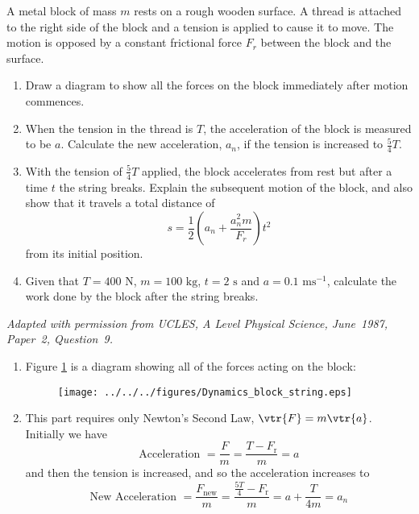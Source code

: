 
\begin{problem}[A1987PSIIQ9a] %
{A metal block of mass $m$ rests on a rough wooden surface. A thread is attached to the right side of the block and a tension is applied to cause it to move. The motion is opposed by a constant frictional force $F_{r}$ between the block and the surface.
\begin{enumerate}
	\item Draw a diagram to show all the forces on the block immediately after motion commences.
	\item When the tension in the thread is $T$, the acceleration of the block is measured to be $a$. Calculate the new acceleration, $a_{n}$, if the tension is increased to $\frac{5}{4}T$.
	\item With the tension of $\frac{5}{4}T$ applied, the block accelerates from rest but after a time $t$ the string breaks. Explain the subsequent motion of the block, and also show that it travels a total distance of 
	\begin{equation*} 
	s = \frac{1}{2} \left(a_{n} + \frac{a_{n}^{2}m}{F_{r}} \right)t^{2}
	\end{equation*} 
	from its initial position.
	\item Given that $T = 400 \text{ N}$, $m = 100 \text{ kg}$, $t = 2 \text{ s}$ and $a = 0.1 \text{ ms}^{-1}$, calculate the work done by the block after the string breaks.
\end{enumerate}
}
{\textit{Adapted with permission from UCLES, A Level Physical Science, June~1987, Paper~2, Question~9.}}
{\begin{enumerate}
	\item Figure \ref{fig:Dynamics_block_string} is a diagram showing all of the forces acting on the block:
\begin{figure}[h]
\centering
\texttt{[image: ../../../figures/Dynamics\_block\_string.eps]}
\caption{}
\label{fig:Dynamics_block_string}
\end{figure}
	\item This part requires only Newton's Second Law, $\vtr{F} = m\vtr{a}$. Initially we have 
	\begin{equation*} 
	\text{Acceleration } = \frac{F}{m} = \frac{T - F_{\text{r}}}{m} = a \end{equation*}
and then the tension is increased, and so the acceleration increases to
	\begin{equation*}
	 \text{New Acceleration } = \frac{F_{\text{new}}}{m} = \frac{\frac{5T}{4} - F_{\text{r}}}{m} = a + \frac{T}{4m} = a_{n} 
	 \end{equation*}
	

\end{enumerate}}
\end{problem}
